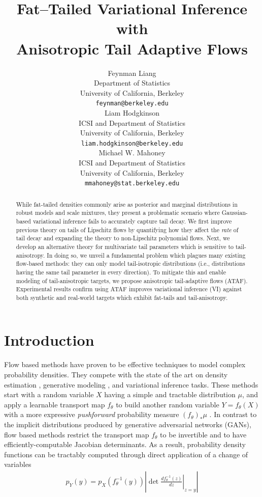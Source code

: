 \documentclass{article}
\title{Fat--Tailed Variational Inference with \\ Anisotropic Tail Adaptive Flows}
\author{%
  Feynman Liang\\
  Department of Statistics\\
  University of California, Berkeley\\
  \texttt{feynman@berkeley.edu} \\
  \And
  Liam Hodgkinson\\
  ICSI and Department of Statistics\\
  University of California, Berkeley\\
  \texttt{liam.hodgkinson@berkeley.edu} \\
  \And
  Michael W. Mahoney\\
  ICSI and Department of Statistics\\
  University of California, Berkeley\\
  \texttt{mmahoney@stat.berkeley.edu} \\
}
\theoremstyle{definition}
\theoremstyle{remark}
\begin{document}
\maketitle

\begin{abstract}
    While fat-tailed densities commonly arise as posterior and marginal
    distributions in robust models and scale mixtures, they present a
    problematic scenario where Gaussian-based variational inference fails
    to accurately capture tail decay. We first improve
    previous theory on tails of Lipschitz flows\citep{jaini2020tails} by
    quantifying how they affect the \emph{rate} of tail decay and
    expanding the theory to non-Lipschitz polynomial flows.
    Next, we develop an alternative theory for multivariate tail parameters which is sensitive to tail-anisotropy. In doing so, we unveil a
    fundamental problem which plagues many existing flow-based methods:
    they can only model tail-isotropic distributions (i.e., distributions having the same tail parameter in every direction).
    To mitigate this and enable modeling of
    tail-anisotropic targets, we propose anisotropic tail-adaptive flows (ATAF).
    Experimental results confirm using ATAF improves
    variational inference (VI) against both synthetic and real-world
    targets which exhibit fat-tails and tail-anisotropy.
\end{abstract}

\section{Introduction}
\label{sec:intro}


Flow based methods 
\citep{papamakarios2021normalizing}
have proven to be effective techniques to model complex
probability densities. They compete with the state of the art on
density estimation \citep{huang2018neural,durkan2019neural,jaini2020tails},
generative modeling \citep{chen2019residual,kingma2018glow}, and variational inference \citep{kingma2016improved,agrawal2020advances} tasks.
These methods start with a random variable $X$ having a simple and tractable
distribution $\mu$, and apply a learnable transport map $f_\theta$ to build
another random variable $Y = f_\theta(X)$ with a more expressive \emph{pushforward}
probability measure $(f_\theta)_\ast \mu$ \citep{papamakarios2021normalizing}.
In contrast to the implicit distributions \citep{huszar2017variational} produced by generative adversarial networks (GANs), flow based methods restrict the transport map $f_\theta$ to be invertible and to have efficiently-computable Jacobian determinants.
As a result, probability density functions can be tractably computed
through direct application of a change of variables
\begin{align}
    \label{eq:change-of-variable}
    p_{Y}(y)
      = p_{X}(f_\theta^{-1}(y)) \left\lvert \det
        \left.\frac{d f_\theta^{-1}(z)}{dz} \right\vert_{z=y}
      \right\rvert
\end{align}
\end{document}
